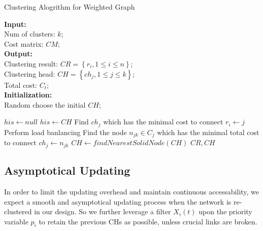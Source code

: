 \documentclass[conference]{IEEEtran}
\begin{document}
\begin{algorithm}[htbp]
\caption{Clustering Alogrithm for Weighted Graph}
{\bf Input:}\\
\hspace*{0.1in}Num of clusters: $k$;\\
\hspace*{0.1in}Cost matrix: $CM$;\\
{\bf Output:}\\
\hspace*{0.1in}Clustering result: $CR=\left \{ r_{i}, 1 \leqslant i \leqslant n \right \}$;\\
\hspace*{0.1in}Clustering head: $CH=\left \{ ch_{j}, 1 \leqslant j \leqslant k \right \}$;\\
\hspace*{0.1in}Total cost: $C_t$;\\
{\bf Initialization:}\\
\hspace*{0.1in}Random choose the initial $CH$;
\begin{algorithmic}[1]
\State $his \leftarrow null$
    \State $his \leftarrow CH$
        \State Find $ch_j$ which has the minimal cost to connect
        \State $r_i \leftarrow j$
    \EndFor
    \State Perform load banlancing
        \State Find the node $n_{jk} \in C_j$ which has the minimal total cost to connect
        \State $ch_j \leftarrow n_{jk}$
    \EndFor
\EndWhile
\State $CH \leftarrow findNearestSolidNode(CH)$
\State \Return $CR, CH$
\end{algorithmic}
\end{algorithm}

\subsection{Asymptotical Updating}
In order to limit the updating overhead and maintain continuous accessability, we expect a smooth and asymptotical updating process when the network is re-clustered in our design. So we further leverage a filter $X_i(t)$ upon the priority variable $p_i$ to retain the previous CHs as possible, unless crucial links are broken.
\end{document}
